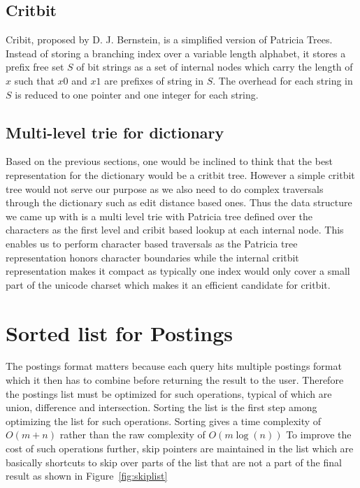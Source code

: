 \subsection{Critbit}
Cribit, proposed by D. J. Bernstein\cite{bernsteinCritbit}, is a simplified version of Patricia Trees.
Instead of storing a branching index over a variable length alphabet, it stores a prefix free set $S$ of bit strings
as a set of internal nodes which carry the length of $x$ such that $x0$ and $x1$ are prefixes of string in $S$.
The overhead for each string in $S$ is reduced to one pointer and one integer for each string.

\subsection{Multi-level trie for dictionary}
Based on the previous sections, one would be inclined to think that the best representation for the dictionary would be a critbit tree.
However a simple critbit tree would not serve our purpose as we also need to do complex traversals through the dictionary such as edit distance based ones.
Thus the data structure we came up with is a multi level trie with Patricia tree defined over the characters as the first level
and cribit based lookup at each internal node.
This enables us to perform character based traversals as the Patricia tree representation honors character boundaries
while the internal critbit representation makes it compact as typically one index would only cover a small part of the unicode charset which makes it
an efficient candidate for critbit.

\section{Sorted list for Postings}
The postings format matters because each query hits multiple postings format which it then has to combine before returning the result to the user.
Therefore the postings list must be optimized for such operations, typical of which are union, difference and intersection.
Sorting the list is the first step among optimizing the list for such operations.
Sorting gives a time complexity of $O(m+n)$ rather than the raw complexity of $O(m \log(n))$
To improve the cost of such operations further, skip pointers are maintained in the list which are basically shortcuts to skip over parts of the list
that are not a part of the final result as shown in Figure~\ref{fig:skiplist}

